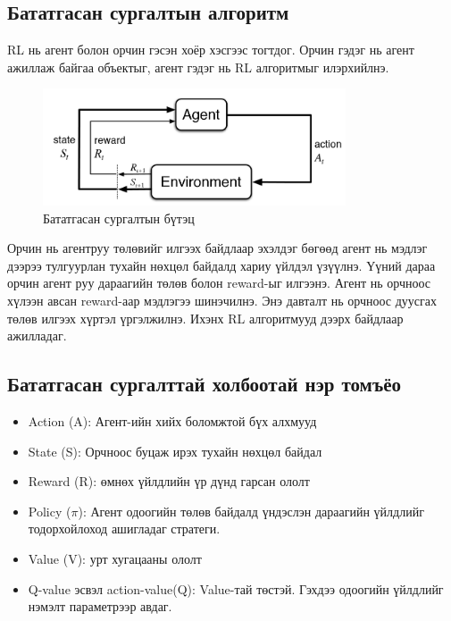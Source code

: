\documentclass[12pt,A4]{report}
\begin{document}
\subsection{Бататгасан сургалтын алгоритм}

RL нь агент болон орчин гэсэн хоёр хэсгээс тогтдог. Орчин гэдэг нь агент ажиллаж байгаа объектыг, агент гэдэг нь RL алгоритмыг илэрхийлнэ.

\begin{figure}[H]
\centering
\includegraphics[width=0.8\textwidth]{./images/rl}
\caption{Бататгасан сургалтын бүтэц}
\end{figure}

Орчин нь агентруу төлөвийг илгээх байдлаар эхэлдэг бөгөөд агент нь мэдлэг дээрээ тулгуурлан тухайн нөхцөл байдалд хариу үйлдэл үзүүлнэ. Үүний дараа орчин агент руу дараагийн төлөв болон reward-ыг илгээнэ. Агент нь орчноос хүлээн авсан reward-аар мэдлэгээ шинэчилнэ. Энэ давталт нь орчноос дуусгах төлөв илгээх хүртэл үргэлжилнэ. Ихэнх RL алгоритмууд дээрх байдлаар ажилладаг.

\subsection{Бататгасан сургалттай холбоотай нэр томъёо}

\begin{itemize}
	\item Action (A): Агент-ийн хийх боломжтой бүх алхмууд
	\item State (S): Орчноос буцаж ирэх тухайн нөхцөл байдал
	\item Reward (R): өмнөх үйлдлийн үр дүнд гарсан ололт
	\item Policy (\(\pi\)): Агент одоогийн төлөв байдалд үндэслэн дараагийн үйлдлийг тодорхойлоход ашигладаг стратеги. 
	\item Value (V): урт хугацааны ололт
	\item Q-value эсвэл action-value(Q): Value-тай төстэй. Гэхдээ одоогийн үйлдлийг нэмэлт параметрээр авдаг.
\end{itemize}
\end{document}
